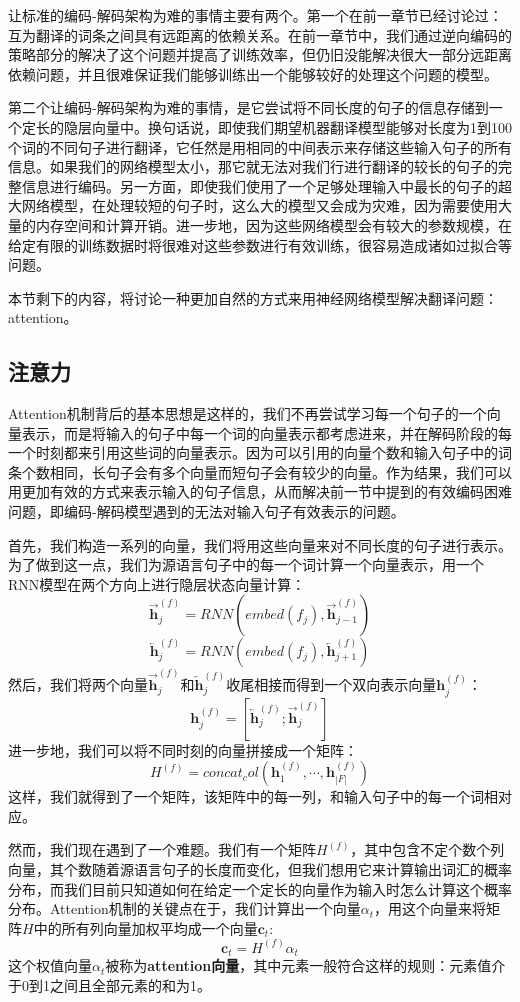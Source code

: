 \documentclass[10pt,a4paper]{ctexart}
\begin{document}
让标准的编码-解码架构为难的事情主要有两个。第一个在前一章节已经讨论过：互为翻译的词条之间具有远距离的依赖关系。在前一章节中，我们通过逆向编码的策略部分的解决了这个问题并提高了训练效率，但仍旧没能解决很大一部分远距离依赖问题，并且很难保证我们能够训练出一个能够较好的处理这个问题的模型。

第二个让编码-解码架构为难的事情，是它尝试将不同长度的句子的信息存储到一个定长的隐层向量中。换句话说，即使我们期望机器翻译模型能够对长度为1到100个词的不同句子进行翻译，它任然是用相同的中间表示来存储这些输入句子的所有信息。如果我们的网络模型太小，那它就无法对我们行进行翻译的较长的句子的完整信息进行编码。另一方面，即使我们使用了一个足够处理输入中最长的句子的超大网络模型，在处理较短的句子时，这么大的模型又会成为灾难，因为需要使用大量的内存空间和计算开销。进一步地，因为这些网络模型会有较大的参数规模，在给定有限的训练数据时将很难对这些参数进行有效训练，很容易造成诸如过拟合等问题。

本节剩下的内容，将讨论一种更加自然的方式来用神经网络模型解决翻译问题：attention。

\subsection{注意力}
Attention机制背后的基本思想是这样的，我们不再尝试学习每一个句子的一个向量表示，而是将输入的句子中每一个词的向量表示都考虑进来，并在解码阶段的每一个时刻都来引用这些词的向量表示。因为可以引用的向量个数和输入句子中的词条个数相同，长句子会有多个向量而短句子会有较少的向量。作为结果，我们可以用更加有效的方式来表示输入的句子信息，从而解决前一节中提到的有效编码困难问题，即编码-解码模型遇到的无法对输入句子有效表示的问题。

首先，我们构造一系列的向量，我们将用这些向量来对不同长度的句子进行表示。为了做到这一点，我们为源语言句子中的每一个词计算一个向量表示，用一个RNN模型在两个方向上进行隐层状态向量计算：
\[
 \overrightarrow{\textbf{h}}_j^{(f)} = RNN(embed(f_j),\overrightarrow{\textbf{h}}_{j-1}^{(f)})
\]
\[
 \overleftarrow{\textbf{h}}_j^{(f)} = RNN(embed(f_j),\overleftarrow{\textbf{h}}_{j+1}^{(f)})
\]
然后，我们将两个向量$\overrightarrow{\textbf{h}}_j^{(f)}$和$\overleftarrow{\textbf{h}}_j^{(f)}$收尾相接而得到一个双向表示向量$\textbf{h}_j^{(f)}$：
\[
 \textbf{h}_j^{(f)} = [\overleftarrow{\textbf{h}}_j^{(f)};\overrightarrow{\textbf{h}}_j^{(f)}]
\]
进一步地，我们可以将不同时刻的向量拼接成一个矩阵：
\[
 H^{(f)} = concat_col(\textbf{h}_1^{(f)},\cdots,\textbf{h}_{|F|}^{(f)})
\]
这样，我们就得到了一个矩阵，该矩阵中的每一列，和输入句子中的每一个词相对应。

然而，我们现在遇到了一个难题。我们有一个矩阵$H^{(f)}$，其中包含不定个数个列向量，其个数随着源语言句子的长度而变化，但我们想用它来计算输出词汇的概率分布，而我们目前只知道如何在给定一个定长的向量作为输入时怎么计算这个概率分布。Attention机制的关键点在于，我们计算出一个向量$\textbf{$\alpha$}_t$，用这个向量来将矩阵$H$中的所有列向量加权平均成一个向量$\textbf{c}_t$:
\[
 \textbf{c}_t = H^{(f)} \textbf{$\alpha$}_t
\]
这个权值向量$\textbf{$\alpha$}_t$被称为\textbf{attention向量}，其中元素一般符合这样的规则：元素值介于0到1之间且全部元素的和为1。
\end{document}
